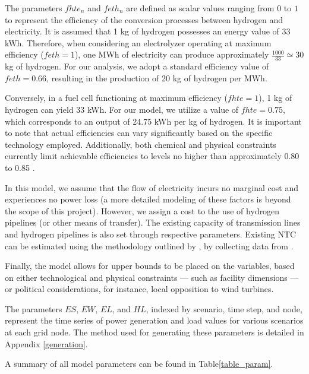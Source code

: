 \documentclass[smallextended,natbib]{svjour3}       %
\numberwithin{definition}{section}
\numberwithin{theorem}{section}
\numberwithin{proposition}{section}
\begin{document}
The parameters \( fhte_n \) and \( feth_n \) are defined as scalar values ranging from \( 0 \) to \( 1 \) to represent the efficiency of the conversion processes between hydrogen and electricity. 
It is assumed that 1 kg of hydrogen possesses an energy value of 33 kWh. 
Therefore, when considering an electrolyzer operating at maximum efficiency (\( feth = 1 \)), one MWh of electricity can produce approximately \( \frac{1000}{33} \simeq 30 \) kg of hydrogen. 
For our analysis, we adopt a standard efficiency value of \( feth = 0.66 \), resulting in the production of 20 kg of hydrogen per MWh.

Conversely, in a fuel cell functioning at maximum efficiency (\( fhte = 1 \)), 1 kg of hydrogen can yield 33 kWh. 
For our model, we utilize a value of \( fhte = 0.75 \), which corresponds to an output of 24.75 kWh per kg of hydrogen. 
It is important to note that actual efficiencies can vary significantly based on the specific technology employed. 
Additionally, both chemical and physical constraints currently limit achievable efficiencies to levels no higher than approximately 0.80 to 0.85 \citep{DAWOOD}.

In this model, we assume that the flow of electricity incurs no marginal cost and experiences no power loss (a more detailed modeling of these factors is beyond the scope of this project). 
However, we assign a cost to the use of hydrogen pipelines (or other means of transfer). 
The existing capacity of transmission lines and hydrogen pipelines is also set through respective parameters. Existing NTC can be estimated using the methodology outlined by \citet[chapter 5]{tesi_NTC}, by collecting data from \cite{entsoe_NTC}. 


Finally, the model allows for upper bounds to be placed on the variables, based on either technological and physical constraints — such as facility dimensions — or political considerations, for instance, local opposition to wind turbines.

The parameters $ES$, $EW$, $EL$, and $HL$, indexed by scenario, time step, and node, represent the time series of power generation and load values for various scenarios at each grid node. 
The method used for generating these parameters is detailed in Appendix \ref{generation}.

A summary of all model parameters can be found in Table\ref{table_param}. 
\end{document}
